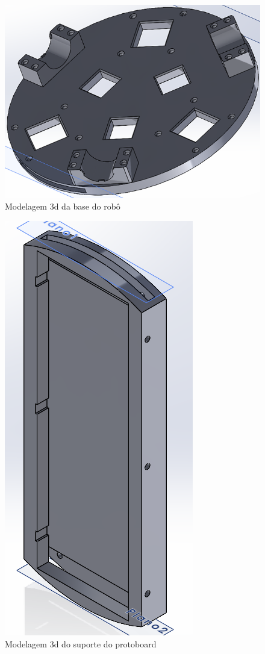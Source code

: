 \begin{figure}[h]
	\centering
	\includegraphics{figures/3d_1}
	\caption{Modelagem 3d da base do robô}
	\label{fig:base_robo_3d}
\end{figure}

\begin{figure}[h]
	\centering
	\includegraphics{figures/3d_2}
	\caption{Modelagem 3d do suporte do protoboard}
	\label{fig:suport_protoboard_3d}
\end{figure}

